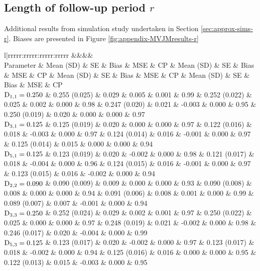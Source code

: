 \begin{landscape}
\subsection{Length of follow-up period \texorpdfstring{$r$}{r}}\label{sec:appendix-MVJMresults-r}
Additional results from simulation study undertaken in Section \ref{sec:approx-sims-r}. Biases are presented in Figure \ref{fig:appendix-MVJMresults-r}
\begin{table}[ht]
\captionsetup{font=scriptsize}
\centering
\begingroup\tiny
\begin{tabular}{l|rrrrr:rrrrr:rrrrr:rrrrr}
  &&&&\\
Parameter & Mean (SD) & SE & Bias & MSE & CP & Mean (SD) & SE & Bias & MSE & CP & Mean (SD) & SE & Bias & MSE & CP & Mean (SD) & SE & Bias & MSE & CP \\ 
  \hline
$\mathrm{D}_{1,1} = 0.250$ &  0.255 (0.025) & 0.029 &  0.005 & 0.001 & 0.99 &  0.252 (0.022) & 0.025 &  0.002 & 0.000 & 0.98 &  0.247 (0.020) & 0.021 & -0.003 & 0.000 & 0.95 &  0.250 (0.019) & 0.020 &  0.000 & 0.000 & 0.97 \\ 
  $\mathrm{D}_{3,1} = 0.125$ &  0.125 (0.019) & 0.020 &  0.000 & 0.000 & 0.97 &  0.122 (0.016) & 0.018 & -0.003 & 0.000 & 0.97 &  0.124 (0.014) & 0.016 & -0.001 & 0.000 & 0.97 &  0.125 (0.014) & 0.015 &  0.000 & 0.000 & 0.94 \\ 
  $\mathrm{D}_{5,1} = 0.125$ &  0.123 (0.019) & 0.020 & -0.002 & 0.000 & 0.98 &  0.121 (0.017) & 0.018 & -0.004 & 0.000 & 0.96 &  0.124 (0.015) & 0.016 & -0.001 & 0.000 & 0.97 &  0.123 (0.015) & 0.016 & -0.002 & 0.000 & 0.94 \\ 
  $\mathrm{D}_{2,2} = 0.090$ &  0.090 (0.009) & 0.009 &  0.000 & 0.000 & 0.93 &  0.090 (0.008) & 0.008 &  0.000 & 0.000 & 0.94 &  0.091 (0.006) & 0.008 &  0.001 & 0.000 & 0.99 &  0.089 (0.007) & 0.007 & -0.001 & 0.000 & 0.94 \\ 
  $\mathrm{D}_{3,3} = 0.250$ &  0.252 (0.024) & 0.029 &  0.002 & 0.001 & 0.97 &  0.250 (0.022) & 0.025 &  0.000 & 0.000 & 0.97 &  0.248 (0.019) & 0.021 & -0.002 & 0.000 & 0.98 &  0.246 (0.017) & 0.020 & -0.004 & 0.000 & 0.99 \\ 
  $\mathrm{D}_{5,3} = 0.125$ &  0.123 (0.017) & 0.020 & -0.002 & 0.000 & 0.97 &  0.123 (0.017) & 0.018 & -0.002 & 0.000 & 0.94 &  0.125 (0.016) & 0.016 &  0.000 & 0.000 & 0.95 &  0.122 (0.013) & 0.015 & -0.003 & 0.000 & 0.95 \\ 

\end{tabular}
\end{table}
\end{landscape}
